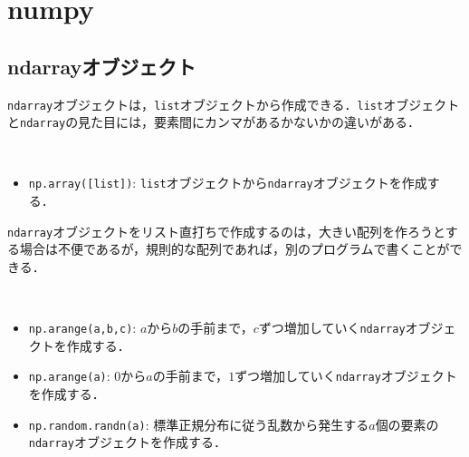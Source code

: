 \section{numpy}

\subsection{ndarrayオブジェクト}

\texttt{ndarray}オブジェクトは，\texttt{list}オブジェクトから作成できる．\texttt{list}オブジェクトと\texttt{ndarray}の見た目には，要素間にカンマがあるかないかの違いがある．

\begin{gram}　
\begin{itemize}
\item \texttt{np.array([list])}: \texttt{list}オブジェクトから\texttt{ndarray}オブジェクトを作成する．
\end{itemize}
\end{gram}

\begin{cod}[\texttt{num1.py}]　
}]{code/num1.py}
\vspace{-9pt}
\begin{lstlisting}
x=[1 2 3]
y=[4 5 6 7]
mylist=[4, 5, 6, 7]
\end{lstlisting}
\end{cod}
\vspace{-10pt}

\texttt{ndarray}オブジェクトをリスト直打ちで作成するのは，大きい配列を作ろうとする場合は不便であるが，規則的な配列であれば，別のプログラムで書くことができる．

\begin{gram}　
\begin{itemize}
\item \texttt{np.arange(a,b,c)}: $a$から$b$の手前まで，$c$ずつ増加していく\texttt{ndarray}オブジェクトを作成する．
\item \texttt{np.arange(a)}: $0$から$a$の手前まで，$1$ずつ増加していく\texttt{ndarray}オブジェクトを作成する．
\item \texttt{np.random.randn(a)}: 標準正規分布に従う乱数から発生する$a$個の要素の\texttt{ndarray}オブジェクトを作成する．
\end{itemize}
\end{gram}

\begin{cod}[\texttt{num2.py}]　
}]{code/num2.py}
\vspace{-10pt}
\begin{lstlisting}
x=[ 0  2  4  6  8 10 12 14 16 18 20 22 24 26 28]
y=[0 1 2 3 4 5 6 7 8 9]
z=[ 0.41391684 -0.27481322 -0.29993306 -0.64974345  0.63441892  0.66554782 -0.52705262  1.1350932  -0.6862161   1.15003734]
\end{lstlisting}
\end{cod}
\vspace{-10pt}